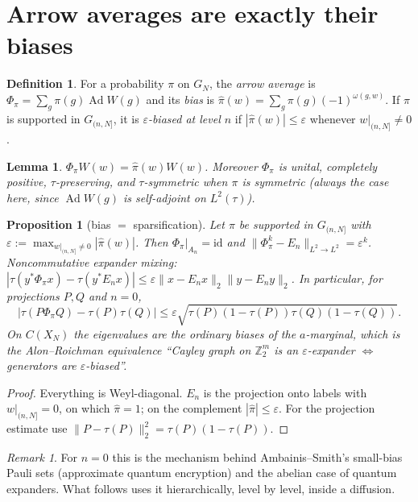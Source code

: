 \documentclass[11pt]{article}
\newtheorem{proposition}[theorem]{Proposition}
\newtheorem{lemma}[theorem]{Lemma}
\theoremstyle{definition}
\newtheorem{definition}[theorem]{Definition}
\theoremstyle{remark}
\newtheorem{remark}[theorem]{Remark}
\newcommand{\Z}{\mathbb Z}
\newcommand{\Ad}{\operatorname{Ad}}
\newcommand{\id}{\mathrm{id}}
\begin{document}
\section{Arrow averages are exactly their biases}\label{sec:bias}

\begin{definition}
For a probability $\pi$ on $G_N$, the \emph{arrow average} is $\Phi_\pi=\sum_g\pi(g)\Ad W(g)$ and its \emph{bias} is $\hat\pi(w)=\sum_g\pi(g)(-1)^{\omega(g,w)}$. If $\pi$ is supported in $G_{(n,N]}$, it is \emph{$\varepsilon$-biased at level $n$} if $|\hat\pi(w)|\le\varepsilon$ whenever $w|_{(n,N]}\neq0$.
\end{definition}

\begin{lemma}\label{lem:bias}
$\Phi_\pi W(w)=\hat\pi(w)W(w)$. Moreover $\Phi_\pi$ is unital, completely positive, $\tau$-preserving, and $\tau$-symmetric when $\pi$ is symmetric (always the case here, since $\Ad W(g)$ is self-adjoint on $L^2(\tau)$).
\end{lemma}

\begin{proposition}[bias $=$ sparsification]\label{prop:sparsify}
Let $\pi$ be supported in $G_{(n,N]}$ with $\varepsilon:=\max_{w|_{(n,N]}\ne0}|\hat\pi(w)|$. Then $\Phi_\pi|_{A_n}=\id$ and $\|\Phi_\pi^k-E_n\|_{L^2\to L^2}=\varepsilon^k$. Noncommutative expander mixing: $|\tau(y^*\Phi_\pi x)-\tau(y^*E_nx)|\le\varepsilon\|x-E_nx\|_2\|y-E_ny\|_2$. In particular, for projections $P,Q$ and $n=0$,
\[|\tau(P\Phi_\pi Q)-\tau(P)\tau(Q)|\le\varepsilon\sqrt{\tau(P)(1-\tau(P))\tau(Q)(1-\tau(Q))}.\]
On $C(X_N)$ the eigenvalues are the ordinary biases of the $a$-marginal, which is the Alon--Roichman equivalence ``Cayley graph on $\Z_2^m$ is an $\varepsilon$-expander $\iff$ generators are $\varepsilon$-biased''.
\end{proposition}

\begin{proof}
Everything is Weyl-diagonal. $E_n$ is the projection onto labels with $w|_{(n,N]}=0$, on which $\hat\pi=1$; on the complement $|\hat\pi|\le\varepsilon$. For the projection estimate use $\|P-\tau(P)\|_2^2=\tau(P)(1-\tau(P))$.
\end{proof}

\begin{remark}
For $n=0$ this is the mechanism behind Ambainis--Smith's small-bias Pauli sets (approximate quantum encryption) and the abelian case of quantum expanders. What follows uses it hierarchically, level by level, inside a diffusion.
\end{remark}
\end{document}
